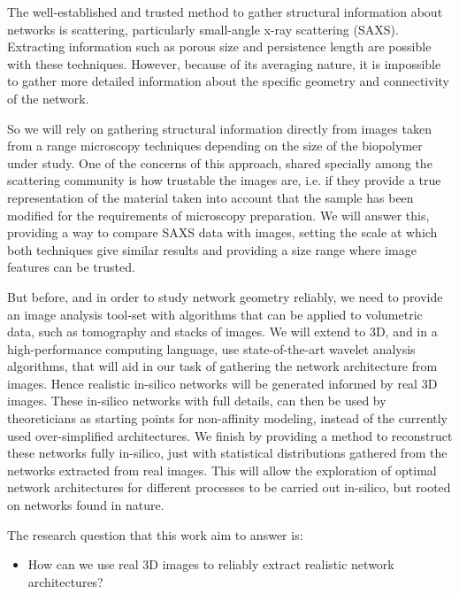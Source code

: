 The well-established and trusted method to gather structural information about networks
is scattering, particularly small-angle x-ray scattering (SAXS). Extracting information such as porous
size and persistence length are possible with these techniques. However, because of its
averaging nature, it is impossible to gather more detailed information about the specific geometry
and connectivity of the network.

So we will rely on gathering structural information directly from images taken from a range microscopy techniques depending on the size of the biopolymer under study.
One of the concerns of this approach, shared specially among the scattering community is how trustable the images are, i.e. if they provide a true representation of the material taken into account that the sample has been modified for the requirements of microscopy preparation. We will answer this, providing a way to compare SAXS data with images, setting the scale at which both techniques give similar results and providing a size range where image features can be trusted.

But before, and in order to study network geometry reliably, we need to provide an image analysis tool-set with algorithms that can be applied to volumetric data, such as tomography and stacks of images.
We will extend to 3D, and in a high-performance computing language, use state-of-the-art wavelet analysis algorithms, that will aid in our task of gathering the network architecture from images.
Hence realistic in-silico networks will be generated informed by real 3D images.
These in-silico networks with full details, can then be used by theoreticians as starting points for non-affinity modeling, instead of the currently used over-simplified architectures.
We finish by providing a method to reconstruct these networks fully in-silico, just with statistical
distributions gathered from the networks extracted from real images. This will allow the exploration of optimal network architectures for different processes to be carried out in-silico, but rooted on networks found in nature.

The research question that this work aim to answer is:
\begin{itemize}
  \item How can we use real 3D images to reliably extract realistic network architectures?
\end{itemize}
